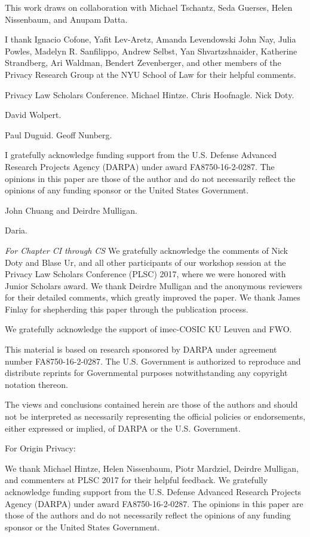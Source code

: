 \documentclass[../thesis.tex]{subfiles}
\begin{document}
This work draws on collaboration with Michael Tschantz, Seda Guerses,
Helen Nissenbaum, and Anupam Datta.

I thank Ignacio Cofone, Yafit Lev-Aretz, Amanda Levendowski
 John Nay, Julia Powles,
Madelyn R. Sanfilippo, Andrew Selbst, Yan Shvartzshnaider, Katherine
Strandberg, Ari Waldman, Bendert Zevenberger,  
and other members of the Privacy Research Group at
the NYU School of Law for their helpful comments.

Privacy Law Scholars Conference. Michael Hintze. Chris Hoofnagle.
Nick Doty.

David Wolpert.

Paul Duguid. Geoff Nunberg.

I gratefully acknowledge funding support 
from the U.S. Defense Advanced Research Projects Agency (DARPA) under
award FA8750-16-2-0287.
The opinions in this paper are those of the author and do not
necessarily reflect the opinions of any funding sponsor or the United
States Government.

John Chuang and Deirdre Mulligan.

Daria.


\emph{For Chapter CI through CS} We gratefully acknowledge the comments of Nick Doty and Blase Ur, and
all other participants of our workshop session at the Privacy Law
Scholars Conference (PLSC) 2017, where we were honored with Junior
Scholars award. We thank Deirdre Mulligan and the anonymous reviewers
for their detailed comments, which greatly improved the paper. We thank
James Finlay for shepherding this paper through the publication
process.

We gratefully acknowledge the support of imec-COSIC KU Leuven and FWO.


This material is based on research sponsored by DARPA under agreement
number FA8750-16-2-0287. The U.S. Government is authorized to reproduce
and distribute reprints for Governmental purposes notwithstanding any
copyright notation thereon.

The views and conclusions contained herein are those of the authors and
should not be interpreted as necessarily representing the official
policies or endorsements, either expressed or implied, of DARPA or the
U.S. Government.



For Origin Privacy:

We thank Michael Hintze, Helen Nissenbaum, Piotr Mardziel,
Deirdre Mulligan, 
and commenters at PLSC 2017 for
their helpful feedback.
We gratefully acknowledge funding support 
from the U.S. Defense Advanced Research Projects
Agency (DARPA) under
award FA8750-16-2-0287.
The opinions in this paper are those of the authors and do not
necessarily reflect the opinions of any funding sponsor or the United States Government.

 
\end{document}
